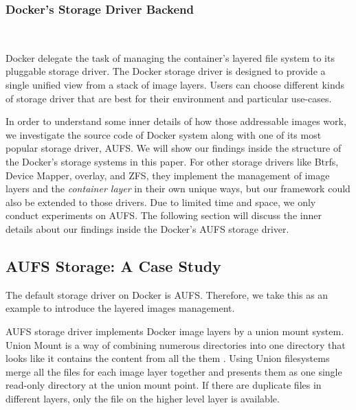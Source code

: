 
\smallbreak
\subsubsection{Docker's Storage Driver Backend}
~\smallbreak

Docker delegate the task of managing the container's layered file system to its pluggable storage driver. 
The Docker storage driver is designed to provide a single unified view from a stack of image layers.
Users can choose different kinds of storage driver that are best for their environment and particular use-cases. 

In order to understand some inner details of how those addressable images work, we investigate the source code of Docker system along with one of its most popular storage driver, AUFS. We will show our findings inside the structure of the Docker's storage systems in this paper. For other storage drivers like Btrfs, Device Mapper, overlay, and ZFS, they implement the management of image layers and the \textit{container layer} in their own unique ways, but our framework could also be extended to those drivers. Due to limited time and space, we only conduct experiments on AUFS. The following section will discuss the inner details about our findings inside the Docker's AUFS storage driver.



\subsection{AUFS Storage: A Case Study}
The default storage driver on Docker is AUFS. Therefore, we take this as an example to introduce the layered images management.

AUFS storage driver implements Docker image layers by a union mount system. Union Mount is a way of combining numerous directories into one directory that looks like it contains the content from all the them \cite{aufs}. Using Union filesystems merge all the files for each image layer together and presents them as one single read-only directory at the union mount point. If there are duplicate files in different layers, only the file on the higher level layer is available.

